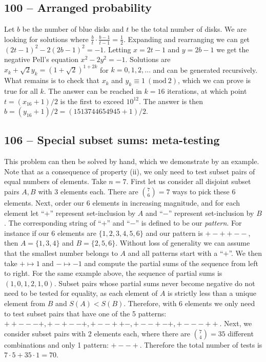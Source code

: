 \documentclass{article}
\newcommand{\Mod}[1]{\ (\mathrm{mod}\ #1)}
\begin{document}
\subsection*{100 -- Arranged probability} 
Let $b$ be the number of blue disks and $t$ be the total number of disks. 
We are looking for solutions where $\frac{b}{t} \cdot \frac{b-1}{t-1} = \frac{1}{2}$. 
Expanding and rearranging we can get $(2t-1)^2 - 2(2b-1)^2 = -1$. 
Letting $x = 2t-1$ and $y = 2b-1$ we get the negative Pell's equation $x^2 - 2y^2 = -1$. 
Solutions are $x_k + \sqrt{2} y_k = (1+\sqrt{2})^{1 + 2k}$ for $k = 0, 1, 2, \dotsc$ and can be generated recursively.
What remains is to check that $x_k$ and $y_k \equiv 1 \Mod{2}$, which we can prove is true for all $k$.
The answer can be reached in $k=16$ iterations, at which point $t = (x_{16}+1)/2$ is the first to exceed $10^{12}$.
The answer is then $b = (y_{16} + 1)/2 =  \boxed{(1513744654945 + 1)/2}$.


\subsection*{106 -- Special subset sums: meta-testing} 
This problem can then be solved by hand, which we demonstrate by an example. 
Note that as a consequence of property (ii), we only need to test subset pairs of equal numbers of elements. 
Take $n=7$. 
First let us consider all disjoint subset pairs $A, B$ with 3 elements each. 
There are $\binom{7}{6} = 7$ ways to pick these 6 elements. 
Next, order our 6 elements in increasing magnitude, and for each element let ``$+$'' represent set-inclusion by $A$ and ``$-$'' represent set-inclusion by $B$. 
The corresponding string of ``$+$'' and ``$-$'' is defined to be our \textit{pattern}. 
For instance if our 6 elements are $\{1, 2, 3, 4, 5, 6\}$ and our pattern is $+-++--$, then $A = \{1, 3, 4\}$ and $B = \{2, 5, 6\}$. 
Without loss of generality we can assume that the smallest number belongs to $A$ and all patterns start with a ``$+$''. 
We then take $+ \mapsto 1$ and $- \mapsto -1$ and compute the partial sums of the sequence from left to right. 
For the same example above, the sequence of partial sums is $(1, 0, 1, 2, 1, 0)$. 
Subset pairs whose partial sums never become negative do not need to be tested for equality, as each element of $A$ is strictly less than a unique element from $B$ and $S(A) < S(B)$. 
Therefore, with 6 elements we only need to test subset pairs that have one of the 5 patterns: $++---+, +-+--+, +--++-, +--+-+, +---++$. 
Next, we consider subset pairs with 2 elements each, where there are $\binom{7}{4}=35$ different combinations and only 1 pattern: $+--+$. 
Therefore the total number of tests is $7\cdot5 + 35\cdot1 = 70$.\\
\end{document}
